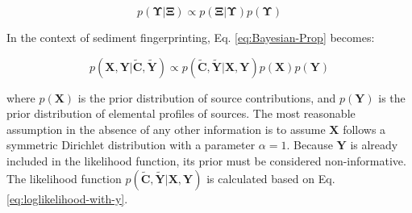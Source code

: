 \begin{equation}\label{eq:Bayesian-Prop}
    p(\mathbf{\Upsilon}|\mathbf{\Xi}) \propto p(\mathbf{\Xi}|\mathbf{\Upsilon})p(\mathbf{\Upsilon})
\end{equation}

In the context of sediment fingerprinting, Eq. \eqref{eq:Bayesian-Prop} becomes:

\begin{equation}\label{eq:Bayesian-Prop}
    p(\mathbf{X},\mathbf{Y}|\mathbf{\tilde C, \tilde Y}) \propto p(\mathbf{\tilde C, \tilde Y}|\mathbf{X},\mathbf{Y})p(\mathbf{X})p(\mathbf{Y})
\end{equation}

where $p(\mathbf{X})$ is the prior distribution of source contributions, and $p(\mathbf{Y})$ is the prior distribution of elemental profiles of sources. The most reasonable assumption in the absence of any other information is to assume $\mathbf{X}$ follows a symmetric Dirichlet distribution with a parameter $\alpha=1$. Because $\mathbf{Y}$ is already included in the likelihood function, its prior must be considered non-informative. The likelihood function $p(\mathbf{\tilde C, \tilde Y}|\mathbf{X},\mathbf{Y})$ is calculated based on Eq. \eqref{eq:loglikelihood-with-y}.